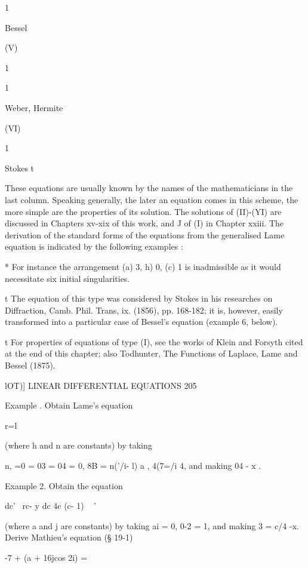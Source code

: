 1


Bessel


(V)


1





1


Weber, Hermite


(VI)








1


Stokes t



These equations are usually known by the names of the mathematicians
in the last column. Speaking generally, the later an equation comes in
this scheme, the more simple are the properties of its solution. The
solutions of (II)-(YI) are discussed in Chapters xv-xix of this work,
and J of (I) in Chapter xxiii. The derivation of the standard forms of
the equations from the generalised Lame equation is indicated by the
following examples :

* For instance the arrangement (a) 3, h) 0, (c) 1 is inadmissible as
it would necessitate six initial singularities.

t The equation of this type was considered by Stokes in his researches
on Diffraction, Camb. Phil. Trans, ix. (1856), pp. 168-182; it is,
however, easily transformed into a particular case of Bessel's
equation (example 6, below).

t For properties of equations of type (I), see the works of Klein and
Forsyth cited at the end of this chapter; also Todhunter, The
Functions of Laplace, Lame and Bessel (1875).



lOT)] LINEAR DIFFERENTIAL EQUATIONS 205

Example . Obtain Lame's equation

r=l

(where h and n are constants) by taking

n, =0 = 03 = 04 = 0, 8B = n('/i- l) a , 4(7=/i 4, and making 04 - x .

Example 2. Obtain the equation

dc' \ rc- y dc 4c (c- 1) ~ '

(where a and j are constants) by taking ai = 0, 0-2 = 1, and making 3
= c/4 -x. Derive Mathieu's equation (§ 19-1)

-7 + (a + 16jcos 2i) =

